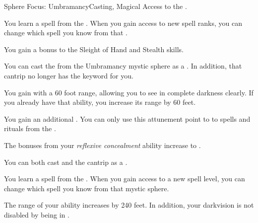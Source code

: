     \begin{feat}{Sphere Focus: Umbramancy}{Casting, Magical}
        \featpre Access to the  .

         You learn a spell from the  .
        When you gain access to new spell ranks, you can change which spell you know from that .

         You gain a  bonus to the Sleight of Hand and Stealth skills.

         You can cast the   from the Umbramancy mystic sphere as a .
        In addition, that cantrip no longer has the  keyword for you.

         You gain  with a 60 foot range, allowing you to see in complete darkness clearly.
        If you already have that ability, you increase its range by 60 feet.

         You gain an additional .
        You can only use this attunement point to  to spells and rituals from the  .

         The bonuses from your \textit{reflexive concealment} ability increase to .

         You can both cast and  the  cantrip as a .

         You learn a spell from the  .
        When you gain access to a new spell level, you can change which spell you know from that mystic sphere.

         The range of your  ability increases by 240 feet.
        In addition, your darkvision is not disabled by being in .
    \end{feat}

